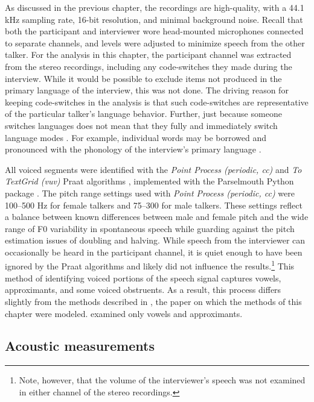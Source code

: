 As discussed in the previous chapter, the recordings are high-quality, with a 44.1 kHz sampling rate, 16-bit resolution, and minimal background noise. Recall that both the participant and interviewer wore head-mounted microphones connected to separate channels, and levels were adjusted to minimize speech from the other talker. For the analysis in this chapter, the participant channel was extracted from the stereo recordings, including any code-switches they made during the interview. While it would be possible to exclude items not produced in the primary language of the interview, this was not done. The driving reason for keeping code-switches in the analysis is that such code-switches are representative of the particular talker's language behavior. Further, just because someone switches languages does not mean that they fully and immediately switch language modes \citep[e.g.,][]{fricke_2016_phonetic}. For example, individual words may be borrowed and pronounced with the phonology of the interview's primary language \citep[cf. the matrix language in code-switching][]{myersscotton_2011_matrix}. 

All voiced segments were identified with the \textit{Point Process (periodic, cc)} and \textit{To TextGrid (vuv)} Praat algorithms \citep{boersma_2021_praat}, implemented with the Parselmouth Python package \citep{jadoul_2018_parselmouth}. The pitch range settings used with \textit{Point Process (periodic, cc)} were 100--500 Hz for female talkers and 75--300 for male talkers. These settings reflect a balance between known differences between male and female pitch \citep{simpson_2009_phonetic} and the wide range of F0 variability in spontaneous speech while guarding against the pitch estimation issues of doubling and halving. While speech from the interviewer can occasionally be heard in the participant channel, it is quiet enough to have been ignored by the Praat algorithms and likely did not influence the results.\footnote{Note, however, that the volume of the interviewer's speech was not examined in either channel of the stereo recordings.} This method of identifying voiced portions of the speech signal captures vowels, approximants, and some voiced obstruents. As a result, this process differs slightly from the methods described in \citet{lee_2019_acoustic}, the paper on which the methods of this chapter were modeled. \citet{lee_2019_acoustic} examined only vowels and approximants. 

\subsection{Acoustic measurements}\label{ch3:sec:acoustic}

